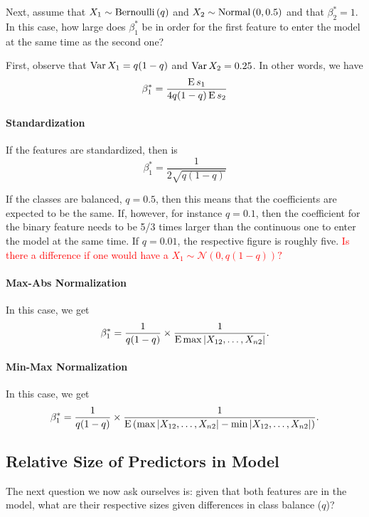 Next, assume that \(X_1 \sim \operatorname{Bernoulli}{(q)}\) and \(X_2 \sim \operatorname{Normal}{(0, 0.5)}\) and that \(\beta^*_2 = 1\). In this case, how large does \(\beta^*_1\) be in order for the first feature to enter the model at the same time as the second one?

First, observe that \(\operatorname{Var}{X_1} = q(1 - q)\) and \(\operatorname{Var}{X_2} = 0.25\). In other words, we have
\begin{equation}
  \label{eq:beta1star}
  \beta^*_1 = \frac{\operatorname{E} s_1}{4q(1-q)\operatorname{E} s_2}
\end{equation}

\paragraph{Standardization} If the features are standardized, then  is
\[
  \beta^*_1 = \frac{1}{2\sqrt{q(1-q)}}
\]

If the classes are balanced, \(q = 0.5\), then this means that the coefficients are expected to be the same. If, however, for instance \(q = 0.1\), then the coefficient for the binary feature needs to be 5/3 times larger than the continuous one to enter the model at the same time. If \(q=0.01\), the respective figure is roughly five. \textcolor{red}{Is there a difference if one would have a $X_1 \sim \mathcal{N}\left(0,q(1-q) \right)?$ }

\paragraph{Max-Abs Normalization} In this case, we get
\[
  \beta^*_1 = \frac{1}{q(1 - q)} \times \frac{1}{\operatorname{E} \max | X_{12}, \dots,  X_{n2} |}.
\]

\paragraph{Min-Max Normalization} In this case, we get
\[
  \beta^*_1 = \frac{1}{q(1 - q)} \times \frac{1}{\operatorname{E} \left(\max | X_{12}, \dots,  X_{n2}| - \min | X_{12}, \dots,  X_{n2} |\right)}.
\]

\subsection{Relative Size of Predictors in Model}

The next question we now ask ourselves is: given that both features are in the model, what are their respective sizes given differences in class balance (\(q\))?

